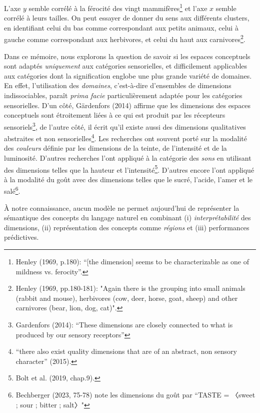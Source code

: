 \documentclass{article}
\begin{document}
L’axe $y$ semble corrélé à la férocité des vingt mammifères\footnote{Henley (1969, p.180): “[the dimension] seems to be characterizable as one of mildness vs. ferocity”.} et l’axe $x$ semble corrélé à leurs tailles. On peut essayer de donner du sens aux différents clusters, en identifiant celui du bas comme correspondant aux petits animaux, celui à gauche comme correspondant aux herbivores, et celui du haut aux carnivores\footnote{Henley (1969, pp.180-181): "Again there is the grouping into small animals (rabbit and mouse), herbivores (cow, deer, horse, goat, sheep) and other carnivores (bear, lion, dog, cat)".}.

Dans ce mémoire, nous explorons la question de savoir si les espaces conceptuels sont adaptés \textit{uniquement} aux catégories sensorielles, et difficilement applicables aux catégories dont la signification englobe une plus grande variété de domaines. En effet, l’utilisation des \textit{domaines}, c’est-à-dire d’ensembles de dimensions indissociables, paraît  \textit{prima facie} particulièrement adaptée pour les catégories sensorielles. D’un côté, Gärdenfors (2014) affirme que les dimensions des espaces conceptuels sont étroitement liées à ce qui est produit par les récepteurs sensoriels\footnote{Gardenfors (2014): “These dimensions are closely connected to what is produced by our sensory receptors”}, de l’autre côté, il écrit qu’il existe aussi des dimensions qualitatives abstraites et non sensorielles\footnote{“there also exist quality dimensions that are of an abstract, non sensory character” (2015).}. Les recherches ont souvent porté sur la modalité des \textit{couleurs} définie par les dimensions de la teinte, de l'intensité et de la luminosité. D’autres recherches l’ont appliqué à la catégorie des \textit{sons} en utilisant des dimensions telles que la hauteur et l'intensité\footnote{Bolt et al. (2019, chap.9).}. D’autres encore l’ont appliqué à la modalité du goût avec des dimensions telles que le sucré, l'acide, l'amer et le salé\footnote{Bechberger (2023, 75-78) note les dimensions du goût par “TASTE = 〈sweet ; sour ; bitter ; salt〉"}.
\par
À notre connaissance, aucun modèle ne permet aujourd’hui de représenter la sémantique des concepts du langage naturel en combinant (i) \textit{interprétabilité} des dimensions, (ii) représentation des concepts comme \textit{régions} et (iii) performances prédictives.
\end{document}
